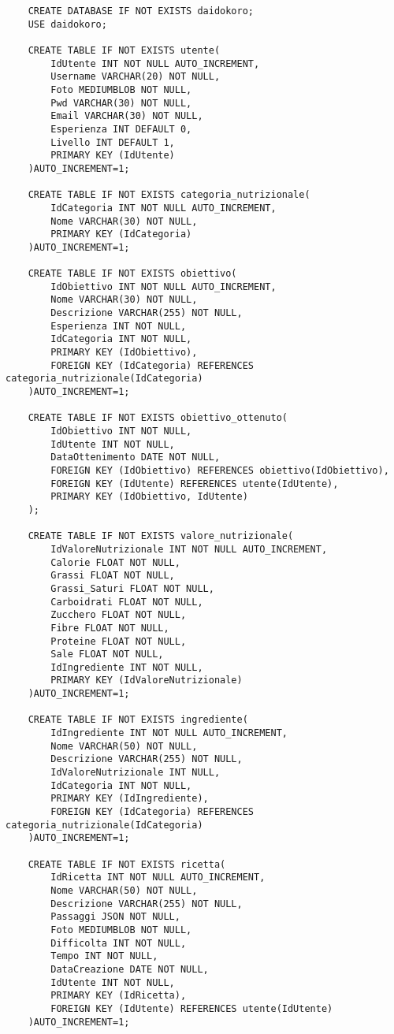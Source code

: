 ﻿\documentclass[a4paper,12pt]{report}
\begin{document}
\begin{verbatim}
    CREATE DATABASE IF NOT EXISTS daidokoro;
    USE daidokoro;
    
    CREATE TABLE IF NOT EXISTS utente(
        IdUtente INT NOT NULL AUTO_INCREMENT,
        Username VARCHAR(20) NOT NULL,
        Foto MEDIUMBLOB NOT NULL,
        Pwd VARCHAR(30) NOT NULL,
        Email VARCHAR(30) NOT NULL,
        Esperienza INT DEFAULT 0,
        Livello INT DEFAULT 1,
        PRIMARY KEY (IdUtente)
    )AUTO_INCREMENT=1;
    
    CREATE TABLE IF NOT EXISTS categoria_nutrizionale(
        IdCategoria INT NOT NULL AUTO_INCREMENT,
        Nome VARCHAR(30) NOT NULL,
        PRIMARY KEY (IdCategoria)
    )AUTO_INCREMENT=1;
    
    CREATE TABLE IF NOT EXISTS obiettivo(
        IdObiettivo INT NOT NULL AUTO_INCREMENT,
        Nome VARCHAR(30) NOT NULL,
        Descrizione VARCHAR(255) NOT NULL,
        Esperienza INT NOT NULL,
        IdCategoria INT NOT NULL,
        PRIMARY KEY (IdObiettivo),
        FOREIGN KEY (IdCategoria) REFERENCES categoria_nutrizionale(IdCategoria)
    )AUTO_INCREMENT=1;
    
    CREATE TABLE IF NOT EXISTS obiettivo_ottenuto(
        IdObiettivo INT NOT NULL,
        IdUtente INT NOT NULL,
        DataOttenimento DATE NOT NULL,
        FOREIGN KEY (IdObiettivo) REFERENCES obiettivo(IdObiettivo),
        FOREIGN KEY (IdUtente) REFERENCES utente(IdUtente),
        PRIMARY KEY (IdObiettivo, IdUtente)
    );
    
    CREATE TABLE IF NOT EXISTS valore_nutrizionale(
        IdValoreNutrizionale INT NOT NULL AUTO_INCREMENT,
        Calorie FLOAT NOT NULL,
        Grassi FLOAT NOT NULL,
        Grassi_Saturi FLOAT NOT NULL,
        Carboidrati FLOAT NOT NULL,
        Zucchero FLOAT NOT NULL,
        Fibre FLOAT NOT NULL,
        Proteine FLOAT NOT NULL,
        Sale FLOAT NOT NULL,
        IdIngrediente INT NOT NULL,
        PRIMARY KEY (IdValoreNutrizionale)
    )AUTO_INCREMENT=1;
    
    CREATE TABLE IF NOT EXISTS ingrediente(
        IdIngrediente INT NOT NULL AUTO_INCREMENT,
        Nome VARCHAR(50) NOT NULL,
        Descrizione VARCHAR(255) NOT NULL,
        IdValoreNutrizionale INT NULL,
        IdCategoria INT NOT NULL,
        PRIMARY KEY (IdIngrediente),
        FOREIGN KEY (IdCategoria) REFERENCES categoria_nutrizionale(IdCategoria)
    )AUTO_INCREMENT=1;
    
    CREATE TABLE IF NOT EXISTS ricetta(
        IdRicetta INT NOT NULL AUTO_INCREMENT,
        Nome VARCHAR(50) NOT NULL,
        Descrizione VARCHAR(255) NOT NULL,
        Passaggi JSON NOT NULL,
        Foto MEDIUMBLOB NOT NULL,
        Difficolta INT NOT NULL,
        Tempo INT NOT NULL,
        DataCreazione DATE NOT NULL,
        IdUtente INT NOT NULL,
        PRIMARY KEY (IdRicetta),
        FOREIGN KEY (IdUtente) REFERENCES utente(IdUtente)
    )AUTO_INCREMENT=1;
    

\end{verbatim}
\end{document}
